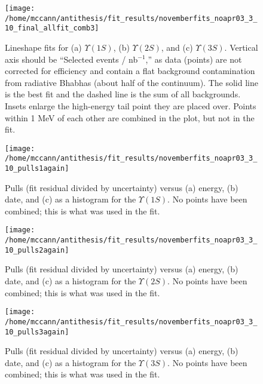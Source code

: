 \documentclass[12pt]{article}
\begin{document}
\begin{figure}
\begin{center}
\texttt{[image: /home/mccann/antithesis/fit\_results/novemberfits\_noapr03\_3\_10\_final\_allfit\_comb3]}
\end{center}
\caption{\label{fits} Lineshape fits for (a) $\Upsilon(1S)$, (b) $\Upsilon(2S)$, and (c) $\Upsilon(3S)$.  Vertical axis should be ``Selected events / nb$^{-1}$,'' as data (points) are not corrected for efficiency and contain a flat background contamination from radiative Bhabhas (about half of the continuum).  The solid line is the best fit and the dashed line is the sum of all backgrounds.  Insets enlarge the high-energy tail point they are placed over.  Points within 1 MeV of each other are combined in the plot, but not in the fit.}
\end{figure}

\begin{figure}
\begin{center}
\texttt{[image: /home/mccann/antithesis/fit\_results/novemberfits\_noapr03\_3\_10\_pulls1again]}
\end{center}
\caption{\label{pulls1} Pulls (fit residual divided by uncertainty) versus (a) energy, (b) date, and (c) as a histogram for the $\Upsilon(1S)$.  No points have been combined; this is what was used in the fit.}
\end{figure}

\begin{figure}
\begin{center}
\texttt{[image: /home/mccann/antithesis/fit\_results/novemberfits\_noapr03\_3\_10\_pulls2again]}
\end{center}
\caption{\label{pulls2} Pulls (fit residual divided by uncertainty) versus (a) energy, (b) date, and (c) as a histogram for the $\Upsilon(2S)$.  No points have been combined; this is what was used in the fit.}
\end{figure}

\begin{figure}
\begin{center}
\texttt{[image: /home/mccann/antithesis/fit\_results/novemberfits\_noapr03\_3\_10\_pulls3again]}
\end{center}
\caption{\label{pulls3} Pulls (fit residual divided by uncertainty) versus (a) energy, (b) date, and (c) as a histogram for the $\Upsilon(3S)$.  No points have been combined; this is what was used in the fit.}
\end{figure}
\end{document}

